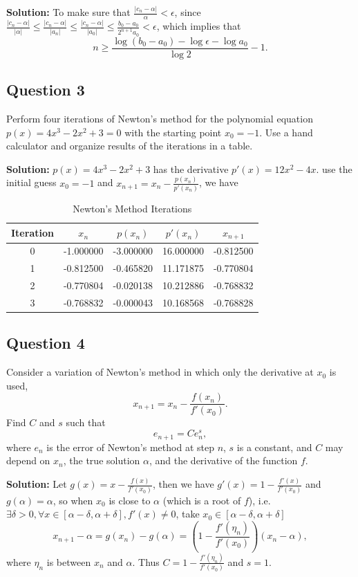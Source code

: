 \documentclass[a4paper]{article}
\begin{document}
\textbf{Solution:}
To make sure that $\frac{\lvert c_n -\alpha\rvert}{\alpha}<\epsilon$, since
$\frac{\lvert c_n-\alpha \rvert}{\lvert\alpha\rvert}\leq\frac{\lvert c_n-\alpha \rvert}{\lvert a_n\rvert}\leq\frac{\lvert c_n-\alpha \rvert}{\lvert a_0 \rvert}\leq\frac{b_0-a_0}{2^{n+1}a_0}<\epsilon$, which implies that 
\[
n \geq \frac{\log(b_0 - a_0) - \log \epsilon - \log a_0}{\log 2} - 1.
\]

\subsection*{Question 3}
Perform four iterations of Newton's method for the polynomial equation $p(x) = 4x^3 - 2x^2 + 3 = 0$ with the starting point $x_0 = -1$. Use a hand calculator and organize results of the iterations in a table.

\textbf{Solution:}
$p(x) = 4x^3 - 2x^2 + 3$ has the derivative $p'(x) = 12x^2 - 4x$.
use the initial guess $x_0 = -1$ and $x_{n+1}=x_n - \frac{p(x_n)}{p'(x_n)}$, we have

\begin{table}[ht]
\centering
\caption{Newton's Method Iterations}
\begin{tabular}{ccccc}
\toprule
Iteration & $x_n$ & $p(x_n)$ & $p'(x_n)$ & $x_{n+1}$ \\
\midrule
0 & -1.000000 & -3.000000 & 16.000000 & -0.812500 \\
1 & -0.812500 & -0.465820 & 11.171875 & -0.770804 \\
2 & -0.770804 & -0.020138 & 10.212886 & -0.768832 \\
3 & -0.768832 & -0.000043 & 10.168568 & -0.768828 \\
\bottomrule
\end{tabular}
\end{table}

\subsection*{Question 4}
Consider a variation of Newton's method in which only the derivative at $x_0$ is used,
\[
x_{n+1} = x_n - \frac{f(x_n)}{f'(x_0)}.
\]
Find $C$ and $s$ such that
\[
e_{n+1} = C e_n^s,
\]
where $e_n$ is the error of Newton's method at step $n$, $s$ is a constant, and $C$ may depend on $x_n$, the true solution $\alpha$, and the derivative of the function $f$.

\textbf{Solution:}
Let $g(x)=x-\frac{f(x)}{f'(x_0)}$, then we have $g'(x)=1-\frac{f'(x)}{f'(x_0)}$ and $g(\alpha)=\alpha$, so when $x_0$ is close to $\alpha$ (which is a root of $f$), i.e.
$\exists \delta>0, \forall x\in[\alpha-\delta,\alpha+\delta], f'(x)\ne0$, take $x_0 \in [\alpha-\delta,\alpha+\delta]$
\[
x_{n+1}-\alpha=g(x_n)-g(\alpha)=\left(1-\frac{f'(\eta_n)}{f'(x_0)}\right)(x_n-\alpha),
\]
where $\eta_n$ is between $x_n$ and $\alpha$. Thus $C = 1-\frac{f'(\eta_n)}{f'(x_0)}$ and $s = 1$.
\end{document}
